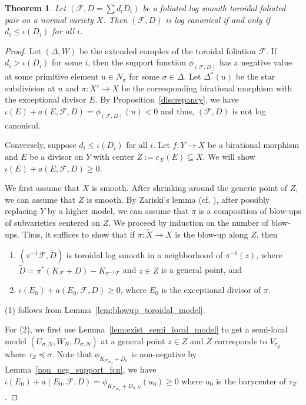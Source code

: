 \documentclass[12pt,reqno]{amsart}
\newtheorem{theorem}{Theorem}[section]
\theoremstyle{definition}
\newcommand\cF{{\mathcal{F}}}
\begin{document}
\begin{theorem}\label{Flogsm_lc}
    Let $(\cF,D = \sum d_iD_i)$ be a foliated log smooth toroidal foliated pair on a normal variety $X$. 
    Then $(\cF,D)$ is log canonical if and only if $d_i\leq\iota(D_i)$ for all $i$. 
\end{theorem}
\begin{proof}
    Let $(\Delta,W)$ be the extended complex of the toroidal foliation $\cF$. 
    If $d_i>\iota(D_i)$ for some $i$, then the support function $\phi_{(\cF,D)}$ has a negative value at some primitive element $u\in N_\sigma$ for some $\sigma\in \Delta$. 
    Let $\Delta^*(u)$ be the star subdivision at $u$ and $\pi\colon X'\to X$ be the corresponding birational morphism with the exceptional divisor $E$. 
    By Proposition~\ref{discrepancy}, we have $\iota(E)+a(E,\cF,D) = \phi_{(\cF,D)}(u)<0$ and thus, $(\cF,D)$ is not log canonical. 
    
    Conversely, suppose $d_i\leq\iota(D_i)$ for all $i$. 
    Let $f\colon Y\to X$ be a birational morphism and $E$ be a divisor on $Y$ with center $Z:=c_X(E)\subseteq X$. 
    We will show $\iota(E)+a(E,\cF,D)\geq 0$. 
    
    We first assume that $X$ is smooth. 
    After shrinking around the generic point of $Z$, we can assume that $Z$ is smooth. 
    By Zariski's lemma (cf. \cite[Lemma 2.45]{KM98}), after possibly replacing $Y$ by a higher model, we can assume that $\pi$ is a composition of blow-ups of subvarieties centered on $Z$. 
    We proceed by induction on the number of blow-ups. 
    Thus, it suffices to show that if $\pi\colon \widetilde{X}\to X$ is the blow-up along $Z$, then 
    \begin{enumerate}
        \item $(\pi^{-1}\cF,\widetilde{D})$ is toroidal log smooth in a neighborhood of $\pi^{-1}(z)$, where $\widetilde{D}=\pi^*(K_\cF+D)-K_{\pi^{-1}\cF}$ and $z\in Z$ is a general point, and
        \item $\iota(E_0)+a(E_0,\cF,D)\geq 0$, where $E_0$ is the exceptional divisor of $\pi$. 
    \end{enumerate}
    
    (1) follows from Lemma~\ref{lem:blowup_toroidal_model}. 
    
    For (2), we first use Lemma~\ref{lem:exist_semi_local_model} to get a semi-local model $(U_{\sigma,N},W_N,D_{\sigma,N})$ at a general point $z\in Z$ and $Z$ corresponds to $V_{\tau_Z}$ where $\tau_Z\preceq\sigma$. 
    Note that $\phi_{K_{\cF_{W_N}}+D_\sigma}$ is non-negative by Lemma~\ref{non_neg_support_fcn}, we have $\iota(E_0)+a(E_0,\cF,D) = \phi_{K_{\cF_{W_N}}+D_{\sigma,N}}(u_0)\geq 0$ where $u_0$ is the barycenter of $\tau_Z$. 


\end{proof}
\end{document}
